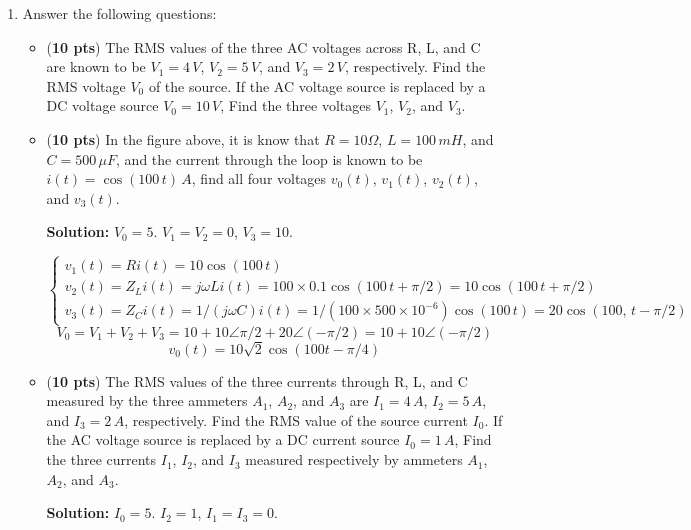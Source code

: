 \begin{enumerate}

\item Answer the following questions:
  \begin{itemize}
  \item ({\bf 10 pts})
    The RMS values of the three AC voltages across R, L, and C are 
    known to be $V_1=4\,V$, $V_2=5\,V$, and $V_3=2\,V$, respectively. 
    Find the RMS voltage $V_0$ of the source. If the AC voltage source 
    is replaced by a DC voltage source $V_0=10\,V$, Find the three 
    voltages $V_1$, $V_2$, and $V_3$.


  \item ({\bf 10 pts})
    In the figure above, it is know that $R=10\Omega$, $L=100\,mH$,
    and $C=500\,\mu F$, and the current through the loop is known to be
    $i(t)=\cos(100\,t)\,A$, find all four voltages $v_0(t)$, $v_1(t)$, 
    $v_2(t)$, and $v_3(t)$.

    {\bf Solution:} 
    $V_0=5$. $V_1=V_2=0$, $V_3=10$.

    \[
    \left\{\begin{array}{lll}
    v_1(t)=R i(t)=10\cos(100\,t)\\
    v_2(t)=Z_L i(t)=j\omega L i(t)=100\times 0.1 \cos(100\,t+\pi/2)=10\cos(100\,t+\pi/2)\\
    v_3(t)=Z_C i(t)=1/(j\omega C) i(t)=1/(100\times 500\times 10^{-6})\cos(100\,t)=20\cos(100,\,t-\pi/2)
    \end{array}\right.
    \]
    \[
    V_0=V_1+V_2+V_3=10+10\angle\pi/2+20\angle(-\pi/2)=10+10\angle(-\pi/2)
    \]
    \[
    v_0(t)=10\sqrt{2}\cos(100t-\pi/4)
    \]

  \item ({\bf 10 pts})
    The RMS values of the three currents through R, L, and C measured 
    by the three ammeters $A_1$, $A_2$, and $A_3$ are $I_1=4\,A$, $I_2=5\,A$, 
    and $I_3=2\,A$, respectively. Find the RMS value of the source current 
    $I_0$. If the AC voltage source is replaced by a DC current source 
    $I_0=1\,A$, Find the three currents $I_1$, $I_2$, and $I_3$ measured 
    respectively by ammeters $A_1$, $A_2$, and $A_3$.


    {\bf Solution:} $I_0=5$. $I_2=1$, $I_1=I_3=0$.
    

  \end{itemize}


\end{enumerate}
